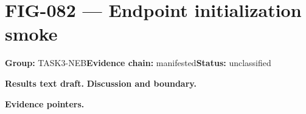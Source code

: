 \clearpage
\section{FIG-082 --- Endpoint initialization smoke}
\label{figpage:fig-082}
\textbf{Group:} TASK3-NEB\quad \textbf{Evidence chain:} manifested\quad \textbf{Status:} unclassified

\textbf{Results text draft.} 
\textbf{Discussion and boundary.} 


\textbf{Evidence pointers.}



\vfill
